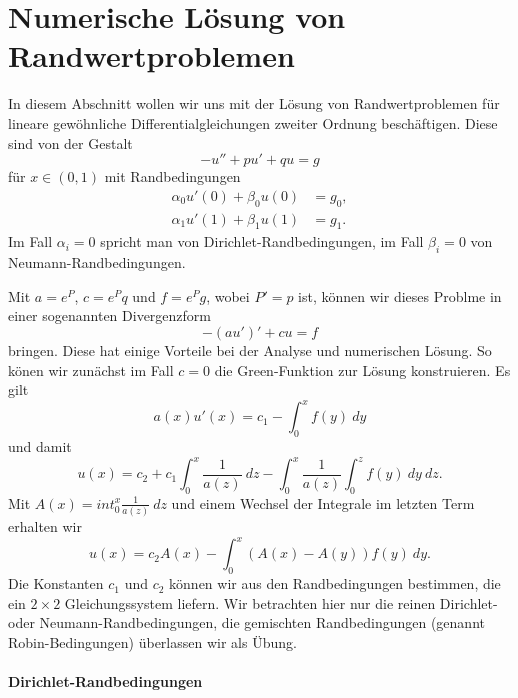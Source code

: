 \chapter{Numerische Lösung von Randwertproblemen} 

In diesem Abschnitt wollen wir uns mit der Lösung von Randwertproblemen f\"ur lineare gew\"ohnliche Differentialgleichungen zweiter Ordnung besch\"aftigen. Diese sind von der Gestalt
\begin{equation}
 - u'' + p u' + q u= g  
\end{equation}
f\"ur $x\in (0,1)$ mit Randbedingungen
\begin{align}
	 \alpha_0 u'(0) + \beta_0 u(0) &= g_0, \label{rb1}\\
	 \alpha_1 u'(1) + \beta_1 u(1) &= g_1. \label{rb2}
\end{align}
Im Fall $\alpha_i = 0$ spricht man von Dirichlet-Randbedingungen, im Fall $\beta_i=0$ von Neumann-Randbedingungen. 

Mit $a=e^P$, $c=e^P q$ und $f=e^P g$, wobei $P' = p$ ist, k\"onnen wir dieses Problme in einer sogenannten Divergenzform
\begin{equation}
	-(au')' + c u = f \label{divergenzform}
\end{equation}
bringen. Diese hat einige Vorteile bei  der Analyse und numerischen L\"osung. So k\"onen wir zun\"achst im Fall $c=0$ die Green-Funktion zur L\"osung konstruieren. Es gilt
$$ a(x) u'(x) = c_1 - \int_0^x f(y) ~dy $$
und damit 
$$ u(x) = c_2 + c_1 \int_0^x \frac{1}{a(z)}~dz - \int_0^x \frac{1}{a(z)}   \int_0^z f(y) ~dy~dz. $$
Mit $A(x) = int_0^x \frac{1}{a(z)}~dz$ und einem Wechsel der Integrale im letzten Term erhalten wir
$$ u(x) = c_2 A(x) - \int_0^x (A(x) - A(y)) f(y)~dy. $$ 
Die Konstanten $c_1$ und $c_2$ k\"onnen wir aus den Randbedingungen bestimmen, die ein $2 \times 2$ Gleichungssystem liefern. Wir 
betrachten hier nur die reinen Dirichlet- oder Neumann-Randbedingungen, die gemischten Randbedingungen (genannt Robin-Bedingungen) \"uberlassen wir als \"Ubung.  

\subsubsection*{Dirichlet-Randbedingungen}

